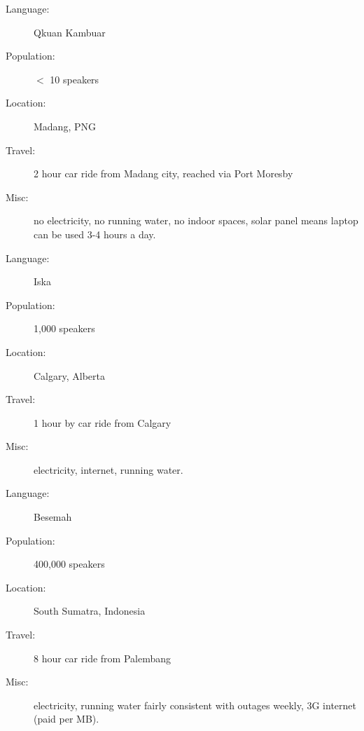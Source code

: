 \documentclass{article}
\begin{document}
\thispagestyle{empty}

%

\begin{description}
\item[Language:] Qkuan Kambuar
\item[Population:] $<$ 10 speakers
\item[Location:] Madang, PNG
\item[Travel:] 2 hour car ride from Madang city, reached via Port Moresby
\item[Misc:] no electricity, no running water, no indoor spaces, solar panel means laptop can be used 3-4 hours a day.
\end{description}

\bigskip

\begin{description}
\item[Language:] Iska
\item[Population:] 1,000 speakers
\item[Location:] Calgary, Alberta 
\item[Travel:] 1 hour by car ride from Calgary 
\item[Misc:] electricity, internet, running water. 
\end{description}

\bigskip

\begin{description}
\item[Language:] Besemah
\item[Population:] 400,000 speakers
\item[Location:] South Sumatra, Indonesia 
\item[Travel:] 8 hour car ride from Palembang 
\item[Misc:] electricity, running water fairly consistent with outages weekly, 3G internet (paid per MB).  
\end{description}
\end{document}
